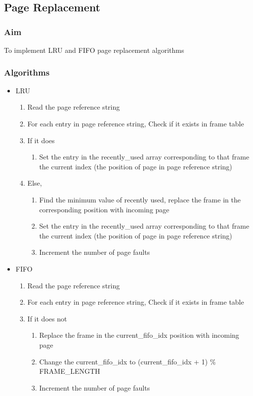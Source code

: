 \documentclass[13pt,oneside]{article}
\begin{document}
\subsection{Page Replacement}
\subsubsection{Aim}
To implement LRU and FIFO page replacement algorithms
\subsubsection{Algorithms}
\begin{itemize}
    \item LRU \\
    \begin{enumerate}
        \item Read the page reference string
        \item For each entry in page reference string, Check if it exists in frame table
        \item If it does
        \begin{enumerate}
            \item Set the entry in the recently\_used array corresponding to that frame the current index (the position of page in page reference string)
        \end{enumerate}
        \item Else,
        \begin{enumerate}
            \item Find the minimum value of recently used, replace the frame in the corresponding position with incoming page
            \item Set the entry in the recently\_used array corresponding to that frame the current index (the position of page in page reference string)
            \item Increment the number of page faults
        \end{enumerate}
    \end{enumerate}
    \item FIFO \\
    \begin{enumerate}
        \item Read the page reference string
        \item For each entry in page reference string, Check if it exists in frame table
        \item If it does not
        \begin{enumerate}
            \item Replace the frame in the current\_fifo\_idx position with incoming page
            \item Change the current\_fifo\_idx to (current\_fifo\_idx + 1) \% FRAME\_LENGTH
            \item Increment the number of page faults
        \end{enumerate}
    \end{enumerate}
\end{itemize}
\end{document}

